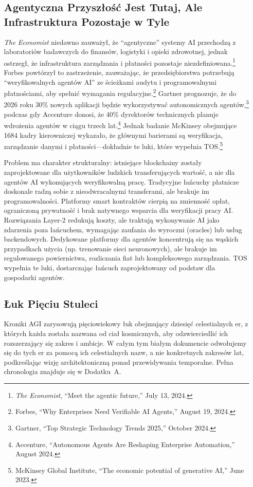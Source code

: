 \documentclass[11pt]{article}
\begin{document}
\subsection{Agentyczna Przyszłość Jest Tutaj, Ale Infrastruktura Pozostaje w Tyle}
\emph{The Economist} niedawno zauważył, że ``agentyczne'' systemy AI przechodzą z laboratoriów badawczych do finansów, logistyki i opieki zdrowotnej, jednak ostrzegł, że infrastruktura zarządzania i płatności pozostaje niezdefiniowana.\footnote{\emph{The Economist}, ``Meet the agentic future,'' July 13, 2024.} Forbes powtórzył to zastrzeżenie, zauważając, że przedsiębiorstwa potrzebują ``weryfikowalnych agentów AI'' ze ścieżkami audytu i programowalnymi płatnościami, aby spełnić wymagania regulacyjne.\footnote{Forbes, ``Why Enterprises Need Verifiable AI Agents,'' August 19, 2024.} Gartner prognozuje, że do 2026 roku 30\% nowych aplikacji będzie wykorzystywać autonomicznych agentów,\footnote{Gartner, ``Top Strategic Technology Trends 2025,'' October 2024.} podczas gdy Accenture donosi, że 40\% dyrektorów technicznych planuje wdrożenia agentów w ciągu trzech lat.\footnote{Accenture, ``Autonomous Agents Are Reshaping Enterprise Automation,'' August 2024.} Jednak badanie McKinsey obejmujące 1684 kadry kierowniczej wykazało, że głównymi barierami są weryfikacja, zarządzanie danymi i płatności---dokładnie te luki, które wypełnia TOS.\footnote{McKinsey Global Institute, ``The economic potential of generative AI,'' June 2023.}

Problem ma charakter strukturalny: istniejące blockchainy zostały zaprojektowane dla użytkowników ludzkich transferujących wartość, a nie dla agentów AI wykonujących weryfikowalną pracę. Tradycyjne łańcuchy płatnicze doskonale radzą sobie z nieodwracalnymi transferami, ale brakuje im programowalności. Platformy smart kontraktów cierpią na zmienność opłat, ograniczoną prywatność i brak natywnego wsparcia dla weryfikacji pracy AI. Rozwiązania Layer-2 redukują koszty, ale traktują wykonywanie AI jako zdarzenia poza łańcuchem, wymagając zaufania do wyroczni (oracles) lub usług backendowych. Dedykowane platformy dla agentów koncentrują się na wąskich przypadkach użycia (np. trenowanie sieci neuronowych), ale brakuje im regulowanego powiernictwa, rozliczania fiat lub kompleksowego zarządzania. TOS wypełnia te luki, dostarczając łańcuch zaprojektowany od podstaw dla gospodarki agentów.

\subsection{Łuk Pięciu Stuleci}
Kroniki AGI zarysowują pięciowiekowy łuk obejmujący dziesięć celestialnych er, z których każda została nazwana od ciał kosmicznych, aby odzwierciedlić ich rozszerzający się zakres i ambicje. W całym tym białym dokumencie odwołujemy się do tych er za pomocą ich celestialnych nazw, a nie konkretnych zakresów lat, podkreślając wizję architektoniczną ponad przewidywania temporalne. Pełna chronologia znajduje się w Dodatku~A.
\end{document}
